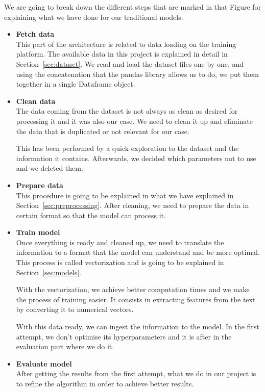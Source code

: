 We are going to break down the different steps that are marked in that Figure for explaining what we have done for our traditional models.

\begin{itemize}
    \item \textbf{Fetch data}\\
    This part of the architecture is related to data loading on the training platform. The available data in this project is explained in detail in Section~\ref{sec:dataset}. We read and load the dataset files one by one, and using the concatenation that the pandas library allows us to do, we put them together in a single Dataframe object.
    
    \item \textbf{Clean data}\\
    The data coming from the dataset is not always as clean as desired for processing it and it was also our case. We need to clean it up and eliminate the data that is duplicated or not relevant for our case.

    This has been performed by a quick exploration to the dataset and the information it contains. Afterwards, we decided which parameters not to use and we deleted them.
    
    \item \textbf{Prepare data}\\
    This procedure is going to be explained in what we have explained in Section~\ref{sec:preprocessing}. After cleaning, we need to prepare the data in certain format so that the model can process it.

    \item \textbf{Train model}\\
    Once everything is ready and cleaned up, we need to translate the information to a format that the model can understand and be more optimal. This process is called vectorization and is going to be explained in Section~\ref{sec:models}.

    With the vectorization, we achieve better computation times and we make the process of training easier. It consists in extracting features from the text by converting it to numerical vectors.

    With this data ready, we can ingest the information to the model. In the first attempt, we don't optimise its hyperparameters and it is after in the evaluation part where we do it.
    \item \textbf{Evaluate model}\\
    After getting the results from the first attempt, what we do in our project is to refine the algorithm in order to achieve better results.


\end{itemize}
